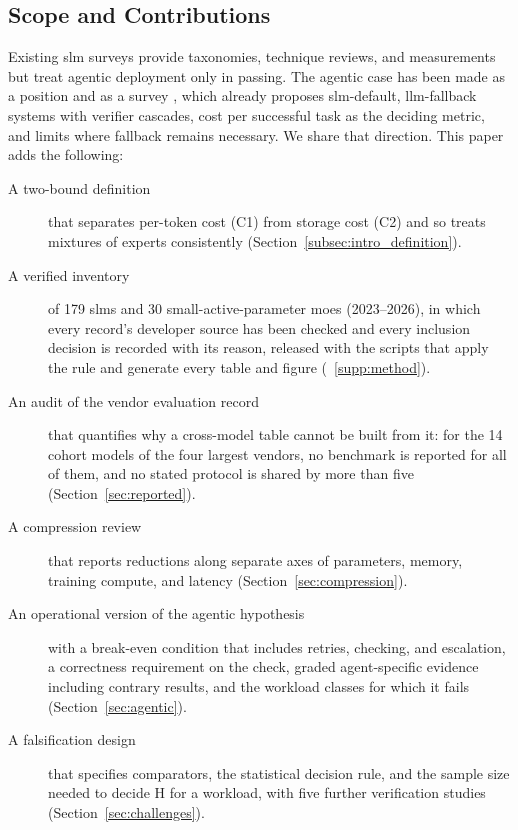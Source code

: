 \subsection{Scope and Contributions}
\label{subsec:intro_gap}

Existing \gls{slm} surveys \citep{lu2024slmsurvey,vannguyen2024slm_survey,wang2024comprehensive,gupta2025slmsurvey} provide taxonomies, technique reviews, and measurements but treat agentic deployment only in passing. The agentic case has been made as a position \citep{belcak2025slm_agentic,tian2026edgeagents} and as a survey \citep{sharma2025slm_agentic}, which already proposes \gls{slm}-default, \gls{llm}-fallback systems with verifier cascades, cost per successful task as the deciding metric, and limits where fallback remains necessary. We share that direction. This paper adds the following:

\begin{description}
  \item[A two-bound definition] that separates per-token cost (C1) from storage cost (C2) and so treats mixtures of experts consistently (Section~\ref{subsec:intro_definition}).
  \item[A verified inventory] of 179 \glspl{slm} and 30 small-active-parameter \glspl{moe} (2023--2026), in which every record's developer source has been checked and every inclusion decision is recorded with its reason, released with the scripts that apply the rule and generate every table and figure (\suppsec~\ref{supp:method}).
  \item[An audit of the vendor evaluation record] that quantifies why a cross-model table cannot be built from it: for the 14 cohort models of the four largest vendors, no benchmark is reported for all of them, and no stated protocol is shared by more than five (Section~\ref{sec:reported}).
  \item[A compression review] that reports reductions along separate axes of parameters, memory, training compute, and latency (Section~\ref{sec:compression}).
  \item[An operational version of the agentic hypothesis] with a break-even condition that includes retries, checking, and escalation, a correctness requirement on the check, graded agent-specific evidence including contrary results, and the workload classes for which it fails (Section~\ref{sec:agentic}).
  \item[A falsification design] that specifies comparators, the statistical decision rule, and the sample size needed to decide H for a workload, with five further verification studies (Section~\ref{sec:challenges}).
\end{description}

